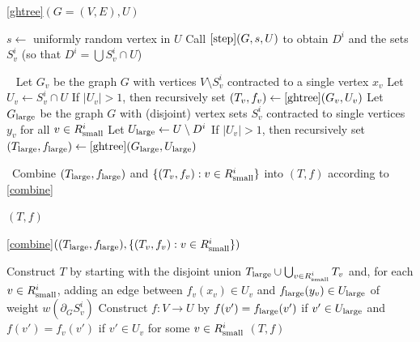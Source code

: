 \documentclass{article}
\newcommand{\lds}{\ldots}
\newcommand{\sm}{\setminus}
\newcommand{\la}{\lambda}
\newcommand{\pt}{\partial}
\newcommand{\lf}{\lfloor}
\newcommand{\rf}{\rfloor}
\newcommand{\1}{\mathbbm 1}
\newcommand{\linel}[1]{\label{line:#1}}
\newcommand{\sma}{{\textup{small}}}
\newcommand{\lar}{{\textup{large}}}
\begin{document}
\begin{algorithm}[H]
\caption{\ref{ghtree}$(G=(V,E),U)$} 
\begin{algorithmic}[1]
\State $s\gets$ uniformly random vertex in $U$
\State Call $\ref{step}(G,s,U)$ to obtain $D^i$ and the sets $S^i_v$ (so that $D^i=\bigcup S^i_v\cap U$)%

\ \linel{max}
 
 \State Let $G_v$ be the graph $G$ with vertices $V\sm S^i_v$ contracted to a single vertex $x_v$ 
 \State Let $U_v\gets S^i_v\cap U$
 \State If $|U_v|>1$, then recursively set $(T_v,f_v)\gets\ref{ghtree}(G_v,U_v)$
\EndFor
\State Let $G_\lar$ be the graph $G$ with (disjoint) vertex sets $S^i_v$ contracted to single vertices $y_v$ for all $v\in R^i_\sma$
\State Let $U_\lar\gets U\sm D^i$
\State If $|U_v|>1$, then recursively set $(T_\lar,f_\lar)\gets\ref{ghtree}(G_\lar,U_\lar)$

\
\State Combine $(T_\lar,f_\lar)$ and $\{(T_v,f_v):v\in R^i_\sma\}$ into $(T,f)$ according to \ref{combine}%

\State\Return $(T,f)$

\end{algorithmic}
\end{algorithm}



\begin{algorithm}[H]
\caption{\ref{combine}$((T_\lar,f_\lar),\{(T_v,f_v): v\in R^i_\sma\} )$} 
\begin{algorithmic}[1]
\State Construct $T$ by starting with the disjoint union $T_\lar\cup\bigcup_{v\in R^i_\sma}T_v$ and, for each $v\in R^i_\sma$, adding an edge between $f_v(x_v)\in U_v$ and $f_\lar(y_v)\in U_\lar$ of weight $w(\pt_GS^i_v)$\linel{combine-T}
\State Construct $f:V\to U$ by $f(v')=f_\lar(v')$ if $v'\in U_\lar$ and $f(v')=f_v(v')$ if $v'\in U_v$ for some $v\in R^i_\sma$\linel{combine-f}
\State\Return $(T,f)$
\end{algorithmic}
\end{algorithm}
\end{document}
